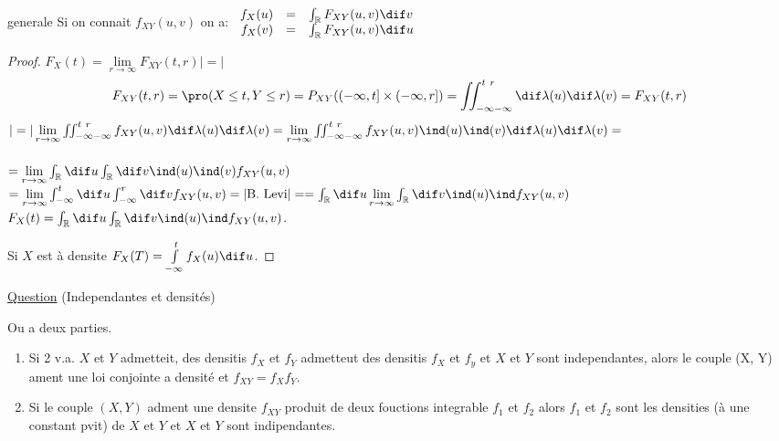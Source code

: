 \begin{proposition}{generale}
	Si on connait $f_{XY}(u, v)$ on a:
	$\begin{array}{rrl}f_X(u) & = & \int_\mathbb{R}F_{XY}(u,v)\dif v\\ f_X(v) & = & \int_\mathbb{R}F_{XY}(u,v)\dif u\end{array}$
\end{proposition}
\begin{proof}
	$F_X(t)=\lim\limits_{r\rightarrow\infty}F_{XY}(t, r)|=|$\\
	$$F_{XY}(t,r)=\pro (X\leq t, Y\leq r)=P_{XY}((-\infty, t]\times(-\infty, r])=\iint_{-\infty -\infty}^{t\ r}\dif \lambda(u) \dif \lambda(v)=F_{XY}(t,r)$$
	$|=|\lim\limits_{r\rightarrow\infty}\iint_{-\infty -\infty}^{t\ r} f_{XY}(u, v)\dif \lambda(u) \dif \lambda(v)=\lim\limits_{r\rightarrow\infty}\iint_{-\infty -\infty}^{t\ r} f_{XY}(u, v)\ind (u)\ind (v)\dif \lambda(u) \dif \lambda(v)=$\\
	\\
	$=\lim\limits_{r\rightarrow\infty}\int_{\mathbb{R}} \dif u \int_{\mathbb{R}} \dif v \ind (u)\ind (v) f_{XY}(u, v)$
	$=\lim\limits_{r\rightarrow\infty}\int_{-\infty}^t \dif u \int_{-\infty}^r \dif v  f_{XY}(u, v) =|\text{B. Levi}|=
	=\int_{\mathbb{R}} \dif u \lim\limits_{r\rightarrow\infty} \int_{\mathbb{R}} \dif v \ind (u)\ind  f_{XY}(u, v)$
	$F_X(t)=\int_{\mathbb{R}} \dif u \int_{\mathbb{R}} \dif v \ind (u)\ind  f_{XY}(u, v)$.
	
	Si $X$ est à densite $F_X(T) = \int\limits_{-\infty}^t f_X(u) \dif u$.
\end{proof}

\underline{Question} (Independantes et densités)
\begin{proposition}
	Ou a deux parties.
	\begin{enumerate}
		\item Si 2 v.a. $X$ et $Y$ admetteit, des densitis $f_X$ et $f_Y$ admetteut des densitis $f_X$ et $f_y$ et $X$ et $Y$ sont independantes, alors le couple (X, Y) ament une loi conjointe a densité et $f_{XY}=f_X f_Y$.
		\item Si le couple $(X, Y)$ adment une densite $f_{XY}$ produit de deux fouctions integrable $f_1$ et $f_2$ alors $f_1$ et $f_2$ sont les densities (à une constant pvit) de $X$ et $Y$ et $X$ et $Y$ sont indipendantes.
	\end{enumerate}
\end{proposition}

